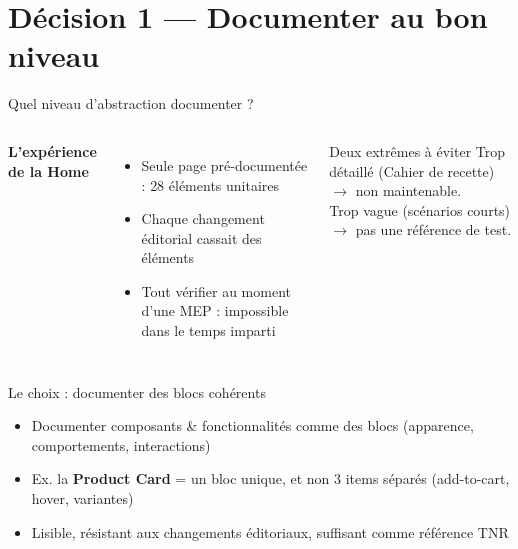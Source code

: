 \section{Décision 1 --- Documenter au bon niveau}

\begin{frame}{Quel niveau d'abstraction documenter ?}
  \begin{columns}[T]
    \textbf{L'expérience de la Home}
    \begin{itemize}\footnotesize
      \item Seule page pré-documentée : \alert{28 éléments} unitaires
      \item Chaque changement éditorial cassait des éléments
      \item Tout vérifier au moment d'une MEP : impossible dans le temps imparti
    \end{itemize}
    \begin{block}{Deux extrêmes à éviter}
      \footnotesize
      Trop \alert{détaillé} (Cahier de recette) $\to$ non maintenable.\\[4pt]
      Trop \alert{vague} (scénarios courts) $\to$ pas une référence de test.
    \end{block}
  \end{columns}
\end{frame}

\begin{frame}{Le choix : documenter des blocs cohérents}
  \begin{itemize}
    \item Documenter \alert{composants \& fonctionnalités} comme des blocs (apparence, comportements, interactions)
    \item Ex. la \textbf{Product Card} = un bloc unique, et non 3 items séparés (add-to-cart, hover, variantes)
    \item Lisible, \alert{résistant aux changements éditoriaux}, suffisant comme référence TNR
  \end{itemize}
  \vskip 6pt
\end{frame}
